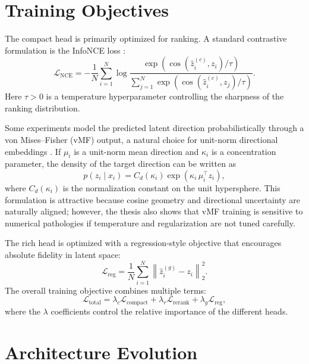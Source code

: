 \section{Training Objectives}

The compact head is primarily optimized for ranking. A standard contrastive formulation is the InfoNCE loss \cite{Oord2018}:
\begin{equation}
\mathcal{L}_{\mathrm{NCE}} = -\frac{1}{N}\sum_{i=1}^{N}
\log
\frac{\exp\left(\cos(\hat{z}^{(c)}_i, z_i)/\tau\right)}
{\sum_{j=1}^{N} \exp\left(\cos(\hat{z}^{(c)}_i, z_j)/\tau\right)}.
\label{eq:info_nce}
\end{equation}
Here $\tau > 0$ is a temperature hyperparameter controlling the sharpness of the ranking distribution.

Some experiments model the predicted latent direction probabilistically through a von Mises--Fisher (vMF) output, a natural choice for unit-norm directional embeddings \cite{Banerjee2005}. If $\mu_i$ is a unit-norm mean direction and $\kappa_i$ is a concentration parameter, the density of the target direction can be written as
\begin{equation}
p(z_i \mid x_i) = C_d(\kappa_i)\exp\left(\kappa_i \, \mu_i^{\top} z_i\right),
\label{eq:vmf_density}
\end{equation}
where $C_d(\kappa_i)$ is the normalization constant on the unit hypersphere. This formulation is attractive because cosine geometry and directional uncertainty are naturally aligned; however, the thesis also shows that vMF training is sensitive to numerical pathologies if temperature and regularization are not tuned carefully.

The rich head is optimized with a regression-style objective that encourages absolute fidelity in latent space:
\begin{equation}
\mathcal{L}_{\mathrm{reg}} = \frac{1}{N}\sum_{i=1}^{N}\left\lVert \hat{z}^{(g)}_i - z_i \right\rVert_2^2.
\label{eq:regression_loss}
\end{equation}
The overall training objective combines multiple terms:
\begin{equation}
\mathcal{L}_{\mathrm{total}} = \lambda_c \mathcal{L}_{\mathrm{compact}} + \lambda_r \mathcal{L}_{\mathrm{rerank}} + \lambda_g \mathcal{L}_{\mathrm{reg}},
\label{eq:total_loss}
\end{equation}
where the $\lambda$ coefficients control the relative importance of the different heads.

\section{Architecture Evolution}
\label{sec:architecture_evolution}

